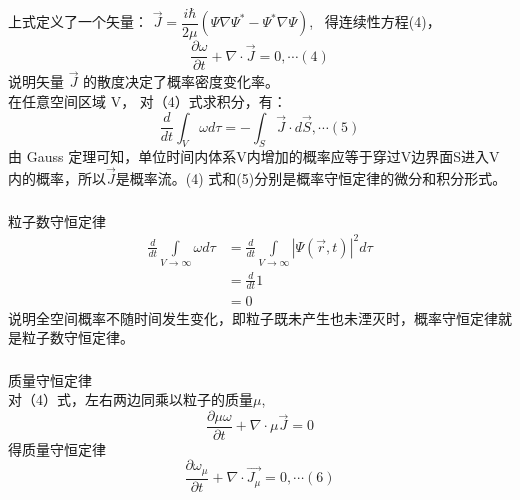 \begin{frame} 
    上式定义了一个矢量： $\vec{J}=\dfrac{i \hbar}{2 \mu} \left(\Psi \nabla \Psi^{*}-\Psi^{*} \nabla \Psi\right) $,  得连续性方程(4)，\\
    \begin{equation*}
        \frac{\partial \omega}{\partial t}+ \nabla \cdot \vec{J}=0, \cdots (4)
    \end{equation*}    
    说明矢量 $\vec{J}$ 的散度决定了概率密度变化率。\\ \vspace{0.6em}
    在任意空间区域 V， 对（4）式求积分，有：
    \begin{equation*}
        \frac{d}{d t} \int_{V} \omega d \tau =-\int_{S} \vec{J} \cdot d \vec{S}, \cdots (5)
    \end{equation*}
    由 Gauss 定理可知，单位时间内体系V内增加的概率应等于穿过V边界面S进入V内的概率，所以$\vec{J}$是概率流。(4) 式和(5)分别是概率守恒定律的微分和积分形式。\\ \vspace{0.3em}
\end{frame}

\begin{frame} \frametitle{}   
    {\Bullet} 粒子数守恒定律\\ \vspace{0.3em}
    \begin{equation*}
        \begin{split}
        \frac{d}{d t} \int\limits_{V\to\infty} \omega d \tau &= \frac{d}{d t} \int\limits_{V\to\infty} |\Psi(\vec{r}, t)|^{2} d \tau  \\
        &=\frac{d}{d t} 1\\ 
        &=0
        \end{split}
    \end{equation*}
    说明全空间概率不随时间发生变化，即粒子既未产生也未湮灭时，概率守恒定律就是粒子数守恒定律。\\ \vspace{0.3em}
\end{frame}

\begin{frame}\frametitle{}
    {\Bullet} 质量守恒定律\\ \vspace{0.3em}
    对（4）式，左右两边同乘以粒子的质量$\mu$, 
    \begin{equation*}
        \frac{\partial \mu\omega}{\partial t}+ \nabla \cdot \mu\vec{J}=0
    \end{equation*}  
    得质量守恒定律
    \begin{equation*}
        \frac{\partial \omega_\mu}{\partial t}+ \nabla \cdot \vec{J_\mu}=0, \cdots (6)
    \end{equation*} 
\end{frame}

